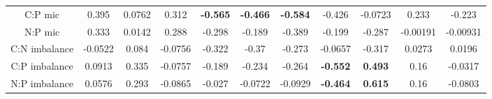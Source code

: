 \documentclass[authoryear,preprint,review,12pt]{elsarticle}
\begin{document}
\begin{table}[h!]
\begin{center}
{\begin{tabular}{ccccccccccc}
  C:P mic & 0.395 & 0.0762 & 0.312 & \textbf{ -0.565 } & \textbf{ -0.466 } & \textbf{ -0.584 } & -0.426 & -0.0723 & 0.233 & -0.223 \\ 
  N:P mic & 0.333 & 0.0142 & 0.288 & -0.298 & -0.189 & -0.389 & -0.199 & -0.287 & -0.00191 & -0.00931 \\ 
  C:N imbalance & -0.0522 & 0.084 & -0.0756 & -0.322 & -0.37 & -0.273 & -0.0657 & -0.317 & 0.0273 & 0.0196 \\ 
  C:P imbalance & 0.0913 & 0.335 & -0.0757 & -0.189 & -0.234 & -0.264 & \textbf{ -0.552 } & \textbf{ 0.493 } & 0.16 & -0.0317 \\ 
  N:P imbalance & 0.0576 & 0.293 & -0.0865 & -0.027 & -0.0722 & -0.0929 & \textbf{ -0.464 } & \textbf{ 0.615 } & 0.16 & -0.0803 \\ 
   \hline
\end{tabular}
}
\end{center}
\end{table}
\newpage
\end{document}
